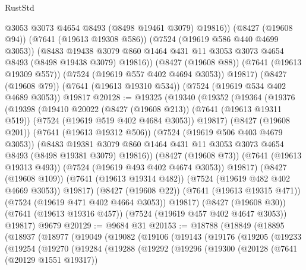 \begin{lexlean}{RustStd}
\begin{coremodule}
            @3053
            @3073
            @4654
            @8493
            (@8498 @19461 @3079)
            @19816))
        (@8427 (@19608 @94))
        (@7641 (@19613 @19308 @586))
        (@7524 (@19619 @586 @440 @4699 @3053))
        (@8483
          @19438
          @3079
          @860
          @1464
          @431
          @11
          @3053
          @3073
          @4654
          @8493
          (@8498 @19438 @3079)
          @19816))
      (@8427 (@19608 @88))
      (@7641 (@19613 @19309 @557))
      (@7524 (@19619 @557 @402 @4694 @3053))
      @19817)
    (@8427 (@19608 @79))
    (@7641 (@19613 @19310 @534))
    (@7524 (@19619 @534 @402 @4689 @3053))
    @19817
@20128 := @19325
    (@19340
      (@19352
        (@19364
          (@19376
            (@19398
              (@19410
                @20022
                (@8427 (@19608 @213))
                (@7641 (@19613 @19311 @519))
                (@7524 (@19619 @519 @402 @4684 @3053))
                @19817)
              (@8427 (@19608 @201))
              (@7641 (@19613 @19312 @506))
              (@7524 (@19619 @506 @403 @4679 @3053))
              (@8483
                @19381
                @3079
                @860
                @1464
                @431
                @11
                @3053
                @3073
                @4654
                @8493
                (@8498 @19381 @3079)
                @19816))
            (@8427 (@19608 @73))
            (@7641 (@19613 @19313 @493))
            (@7524 (@19619 @493 @402 @4674 @3053))
            @19817)
          (@8427 (@19608 @109))
          (@7641 (@19613 @19314 @482))
          (@7524 (@19619 @482 @402 @4669 @3053))
          @19817)
        (@8427 (@19608 @22))
        (@7641 (@19613 @19315 @471))
        (@7524 (@19619 @471 @402 @4664 @3053))
        @19817)
      (@8427 (@19608 @30))
      (@7641 (@19613 @19316 @457))
      (@7524 (@19619 @457 @402 @4647 @3053))
      @19817)
    @9679
@20129 := @9684 @31
@20153 := @18788
    (@18849
      (@18895
        (@18937
          (@18977
            (@19049
              (@19082
                (@19106
                  (@19143
                    (@19176
                      (@19205
                        (@19233
                          (@19254
                            (@19270
                              (@19284
                                (@19288
                                  (@19292
                                    (@19296
                                      (@19300
                                        (@20128
                                          (@7641 (@20129 @1551 @19317))

\end{coremodule}
\end{lexlean}
